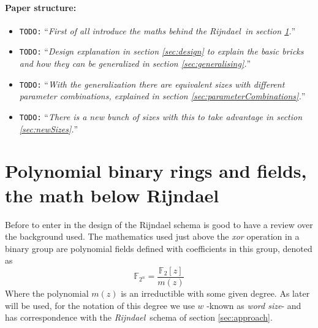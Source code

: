 \documentclass[10pt,a4paper,twoside]{llncs}
\newcommand{\todo}[1]{\texttt{\color{red}TODO:} ``\emph{#1}''}
\newcommand{\rijndael}{\emph{Rijndael}}
\newcommand{\Fpn}[2]{\ensuremath{\mathbb{F}_{#1^#2}}}
\begin{document}
\paragraph{Paper structure:}
\begin{itemize}
 \item \todo{First of all introduce the maths behind the \rijndael\, in section \ref{sec:math}.}
 \item \todo{Design explanation in section \ref{sec:design} to explain the basic bricks and how they can be generalized in section \ref{sec:generalising}.}
 \item \todo{With the generalization there are equivalent sizes with different parameter combinations, explained in section \ref{sec:parameterCombinations}.}
 \item \todo{There is a new bunch of sizes with this to take advantage in section \ref{sec:newSizes}.}
\end{itemize}

\section{Polynomial binary rings and fields, the math below Rijndael}\label{sec:math}
Before to enter in the design of the Rijndael schema is good to have a review over the background used. The mathematics used just above the \emph{xor} operation in a binary group are polynomial fields defined with coefficients in this group, denoted as
\begin{equation}\label{eq:polynomialField} 
    \Fpn{2}{n}=\frac{\mathbb{F}_{2}[z]}{m(z)}
\end{equation}
Where the polynomial $m(z)$ is an irreductible with some given degree. As later will be used, for the notation of this degree we use $w$ -known as \emph{word size}- and has correspondence with the \rijndael\, schema of section \ref{sec:approach}.
\end{document}
